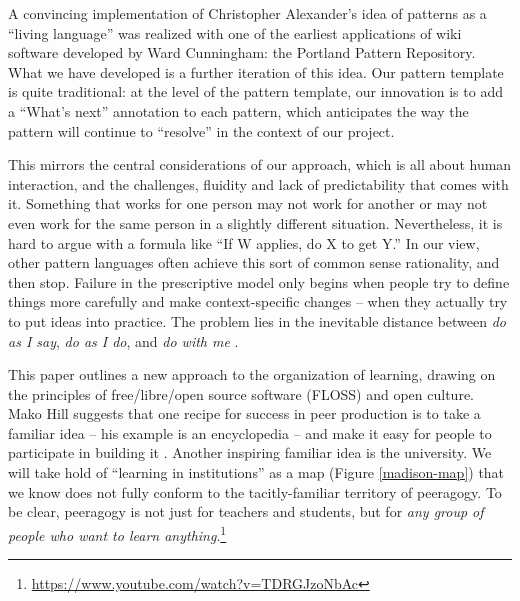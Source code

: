 A convincing implementation of Christopher Alexander’s idea of patterns as a ``living language'' \cite[p.~xvii]{alexander1977pattern} was realized with one of the earliest applications of wiki software developed by Ward Cunningham: the Portland Pattern Repository.  What we have developed is a further iteration of this idea.   Our pattern template is quite traditional: at the level of the pattern template, our innovation is to add a ``What's next'' annotation to each pattern, which anticipates the way the pattern will continue to ``resolve'' in the context of our project. 


This mirrors the central considerations of our approach, which is all about human interaction, and the challenges, fluidity and lack of predictability that comes with it.  Something that works for one person may not work for another or may not even work for the same person in a slightly different situation.  Nevertheless, it is hard to argue with a formula like ``If W applies, do X to get Y.'' In our view, other pattern languages often achieve this sort of common sense rationality, and then stop.  Failure in the prescriptive model only begins when people try to define things more carefully and make context-specific changes -- when they actually try to put ideas into practice.  The problem lies in the inevitable distance between \emph{do as I say}, \emph{do as I do}, and \emph{do with me} \cite[p.~26]{deleuze1994difference}.

This paper outlines a new approach to the organization of learning, drawing on the principles of free/libre/open source software (FLOSS) and open culture.  Mako Hill suggests that one recipe for success in peer production is to take a familiar idea -- his example is an encyclopedia -- and make it easy for people to participate in building it \cite[Chapter 1]{mako-thesis}.  Another inspiring familiar idea is the university.  We will take hold of ``learning in institutions'' as a map (Figure \ref{madison-map}) that we know does not fully conform to the tacitly-familiar territory of peeragogy.  To be clear, peeragogy is not just for teachers and students, but for \emph{any group of people who want to learn anything}.\footnote{\url{https://www.youtube.com/watch?v=TDRGJzoNbAc}}


